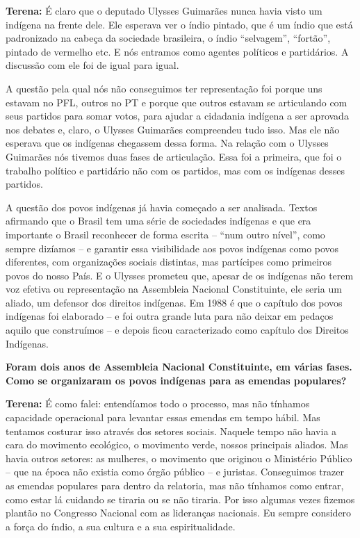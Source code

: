 \textbf{Terena:} É claro que o deputado Ulysses Guimarães nunca havia
visto um indígena na frente dele. Ele esperava ver o índio pintado, que
é um índio que está padronizado na cabeça da sociedade brasileira, o
índio ``selvagem'', ``fortão'', pintado de vermelho etc. E nós entramos
como agentes políticos e partidários. A discussão com ele foi de igual
para igual.

A questão pela qual nós não conseguimos ter representação foi porque uns
estavam no PFL, outros no PT e porque que outros estavam se articulando
com seus partidos para somar votos, para ajudar a cidadania indígena a
ser aprovada nos debates e, claro, o Ulysses Guimarães compreendeu tudo
isso. Mas ele não esperava que os indígenas chegassem dessa forma. Na
relação com o Ulysses Guimarães nós tivemos duas fases de articulação.
Essa foi a primeira, que foi o trabalho político e partidário não com os
partidos, mas com os indígenas desses partidos.

A questão dos povos indígenas já havia começado a ser analisada. Textos
afirmando que o Brasil tem uma série de sociedades indígenas e que era
importante o Brasil reconhecer de forma escrita -- ``num outro nível'',
como sempre dizíamos -- e garantir essa visibilidade aos povos indígenas
como povos diferentes, com organizações sociais distintas, mas
partícipes como primeiros povos do nosso País. E o Ulysses prometeu que,
apesar de os indígenas não terem voz efetiva ou representação na
Assembleia Nacional Constituinte, ele seria um aliado, um defensor dos
direitos indígenas. Em 1988 é que o capítulo dos povos indígenas foi
elaborado -- e foi outra grande luta para não deixar em pedaços aquilo
que construímos -- e depois ficou caracterizado como capítulo dos
Direitos Indígenas.

\textbf{Foram dois anos de Assembleia Nacional Constituinte, em várias
fases. Como se organizaram os povos indígenas para as emendas
populares?}

\textbf{Terena:} É como falei: entendíamos todo o processo, mas não
tínhamos capacidade operacional para levantar essas emendas em tempo
hábil. Mas tentamos costurar isso através dos setores sociais. Naquele
tempo não havia a cara do movimento ecológico, o movimento verde, nossos
principais aliados. Mas havia outros setores: as mulheres, o movimento
que originou o Ministério Público -- que na época não existia como órgão
público -- e juristas. Conseguimos trazer as emendas populares para
dentro da relatoria, mas não tínhamos como entrar, como estar lá
cuidando se tiraria ou se não tiraria. Por isso algumas vezes fizemos
plantão no Congresso Nacional com as lideranças nacionais. Eu sempre
considero a força do índio, a sua cultura e a sua espiritualidade.

